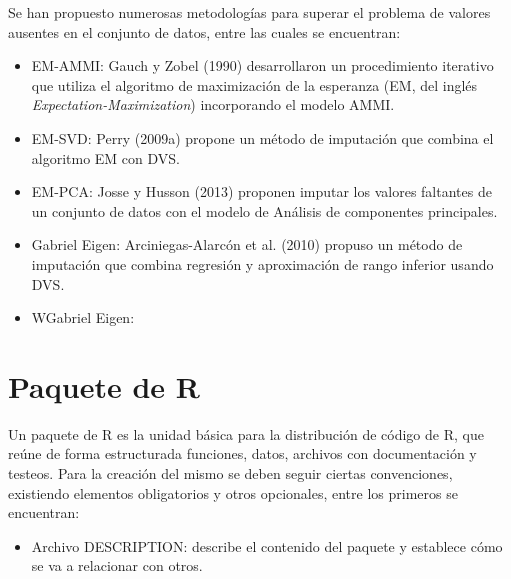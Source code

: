 Se han propuesto numerosas metodologías para superar el problema de valores ausentes en el conjunto de datos, entre las cuales se encuentran:

\begin{itemize}
\item EM-AMMI: Gauch y Zobel (1990) desarrollaron un procedimiento iterativo que utiliza el algoritmo de maximización de la esperanza (EM, del inglés \emph{Expectation-Maximization}) incorporando el modelo AMMI. 
\end{itemize}
\begin{itemize}
\item EM-SVD: Perry (2009a) propone un método de imputación que combina el algoritmo EM con DVS. 
\end{itemize}
\begin{itemize}
\item EM-PCA: Josse y Husson (2013) proponen imputar los valores faltantes de un conjunto de datos con el modelo de Análisis de componentes principales.
\end{itemize}
\begin{itemize}
\item Gabriel Eigen: Arciniegas-Alarcón et al. (2010) propuso un método de imputación que combina regresión y aproximación de rango inferior usando DVS. 
\end{itemize}
\begin{itemize}
\item WGabriel Eigen: 
\end{itemize}




\section{Paquete de R}



Un paquete de R es la unidad básica para la distribución de código de R, que reúne de forma estructurada funciones, datos, archivos con documentación y testeos.  Para la creación del mismo se deben seguir ciertas convenciones, existiendo elementos obligatorios y otros opcionales, entre los primeros se encuentran:

\begin{itemize}
	\item Archivo DESCRIPTION: describe el contenido del paquete y establece cómo se va a relacionar con otros.
\end{itemize}

